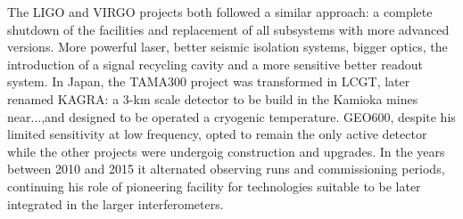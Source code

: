 The LIGO and VIRGO projects both followed a similar approach: a complete shutdown of the facilities and replacement of all subsystems with more advanced versions. More powerful laser, better seismic isolation systems, bigger optics, the introduction of a signal recycling cavity and a more sensitive better readout system.
In Japan, the TAMA300 project was transformed in LCGT, later renamed KAGRA: a 3-km scale detector to be build in the Kamioka mines near...,and designed to be operated a cryogenic temperature.
GEO600, despite his limited sensitivity at low frequency, opted to remain the only active detector while the other projects were undergoig construction and upgrades. In the years between 2010 and 2015 it alternated observing runs and commissioning periods, continuing his role of pioneering facility for technologies suitable to be later integrated in the larger interferometers.



 

